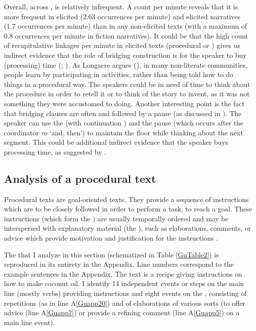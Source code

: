 \documentclass[output=paper]{LSP/langsci}
\begin{document}
Overall, across ,  is relatively infrequent. A count per minute reveals that it is more frequent in elicited  (2.63 occurrences per minute) and elicited narratives (1.7 occurrences per minute) than in any non-elicited texts (with a maximum of 0.8 occurrences per minute in fiction narratives). It could be that the high count of recapitulative linkages per minute in elicited texts (procedural or ) gives us indirect evidence that the role of bridging construction is for the speaker to buy (processing) time (\citealt[][378]{devries.2005}; \citeyear[][817]{devries.2006}). As Longacre argues (\citeyear[][9--10]{longacre83}), in many non-literate communities, people learn by participating in activities, rather than being told how to do things in a procedural way. The speakers could be in need of time to think about the procedure in order to retell it or to think of the story to invent, as it was not something they were accustomed to doing. Another interesting point is the fact that bridging clauses are often  and followed by a pause (as discussed in ). The speaker can use the  (with continuation ) and the pause (which occurs after the coordinator \textit{ro} `and, then') to maintain the floor while thinking about the next segment. This could be additional indirect evidence that the speaker buys processing time, as suggested by \citet[][817]{devries.2006}. 


\subsection{Analysis of a procedural text} 
\label{Gusec:procedural}
Procedural texts are goal-oriented texts. They provide a sequence of instructions which are to be closely followed in order to perform a task, to reach a goal. These instructions (which form the ) are usually temporally ordered and may be interspersed with explanatory material (the ), such as elaborations, comments, or advice which provide motivation and justification for the instructions \citep{adam01,fontan08,delpech08}. 

The  that I analyze in this section (schematized in Table \ref{GuTable2}) is reproduced in its entirety in the Appendix. Line numbers correspond to the example sentences in the Appendix. The text is a recipe giving instructions on how to make coconut oil. I identify 14 independent events or steps on the main line (mostly  verbs) providing instructions and eight events on the , consisting of repetitions (as in line A\ref{Guapp20}) and of elaborations of various sorts (to offer advice (line A\ref{Guapp7}) or provide a refining comment (line A\ref{Guapp5}) on a main line event). 
\end{document}
